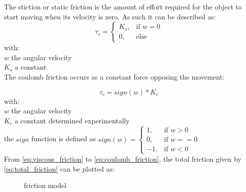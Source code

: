 The stiction or static friction is the amount of effort required for the object to start moving when its velocity is zero. As such it can be described as:
\vspace{9pt}
\begin{equation} 
\tau_s =  \begin{cases} K_s, & \mbox{if } w = 0 \\ 0, & \mbox{else} \end{cases}
\label{eq:static_friction}
\end{equation}
with:\\
\hspace*{8mm}$w$ the angular velocity\\
\hspace*{8mm}$K_s$ a constant\\

The coulomb friction occurs as a constant force opposing the movement:

\begin{equation}
\tau_c = sign(w)*K_c
\label{eq:coulomb_friction}
\end{equation}
with:\\
\hspace*{8mm}$w$ the angular velocity\\
\hspace*{8mm}$K_c$ a constant determined experimentally\\
\hspace*{8mm}the $sign$ function is defined as $sign(w) = \begin{cases} 1, & \mbox{if } w > 0 \\ 0, & \mbox{if } w == 0 \\ -1, & \mbox{if } w < 0\end{cases}$\\

From \eqref{eq:viscous_friction} to \eqref{eq:coulomb_friction}, the total friction given by \eqref{eq:total_friction} can be plotted as:

\begin{figure}[h]
\centering
\caption{friction model}
\end{figure}

